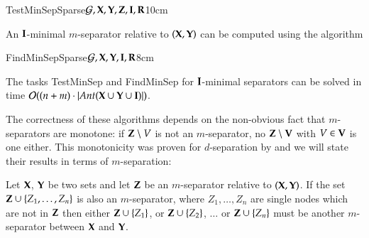 \begin{algo}{TestMinSepSparse}{${\cal G}, {\bf X}, {\bf Y}, {\bf Z}, {\bf I}, {\bf R}$}{\label{algo:isminimalsepnaive}}{10cm}

 \EndIf
{} \EndIf
%
 \EndIf
\EndFor
{}
\end{algo}
%
An ${\bf I}$-minimal $ m $-separator relative to $ ({\bf X}, {\bf Y})  $ can be computed 
using the algorithm 

\begin{algo}{FindMinSepSparse}{${\cal G}, {\bf X}, {\bf Y}, {\bf I}, {\bf R}$}{\label{algo:findminimalsepnaive}}{8cm}
{\Return{$\bot$}}
\EndIf
{}
 \EndIf
\EndFor
\State{\Return{$\bZ$}}
\end{algo}

\begin{proposition}
The tasks {\sc TestMinSep} and  {\sc FindMinSep}
for ${\bf I}$-minimal separators can be solved in time ${\cal O}( (n+m) \cdot | \textit{Ant}({\bf X} \cup {\bf Y} \cup {\bf I}) |  )$.
\end{proposition}

The correctness of these algorithms depends on the non-obvious fact that $m$-separators are monotone:  if ${\bf Z} \setminus V$ is not an $m$-separator, no ${\bf Z} \setminus {\bf V}$ with $V\in {\bf V}$ is one either. This monotonicity was proven for $d$-separation by \cite{TianPP1998} and we will state their results in terms of  $m$-separation: %

%
%
%
%
 
%
%
%
%
%
%
%
\begin{lemma}\label{lem:monotone:m:separators}
Let ${\bf X}$, ${\bf Y}$ be two sets and let $\bZ$ be an $m$-separator relative to $({\bf X},{\bf Y})$. 
If the set ${\bf Z} \cup \{Z_1, \ldots, Z_n\}$ is also an $ m $-separator, where $Z_1, \ldots, Z_n$ are single nodes which are not in $\bZ$ then either ${\bf Z} \cup \{Z_1\}$, or ${\bf Z} \cup \{Z_2\}$, $\ldots$ or ${\bf Z}\cup \{Z_n\}$ must be another $ m $-separator between $ {\bf X} $ and $ {\bf Y} $.
\end{lemma}


